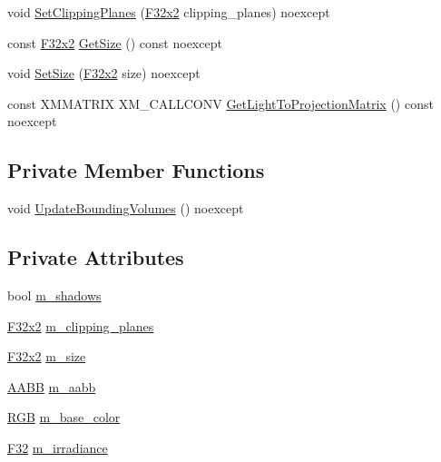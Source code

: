 \begin{DoxyCompactItemize}
\item 
void \mbox{\hyperlink{classmage_1_1rendering_1_1_directional_light_ae90562c217d876a3a2a73f36f36a700f}{Set\+Clipping\+Planes}} (\mbox{\hyperlink{namespacemage_aee4759dedc8def6c6dec26b5c7eddf29}{F32x2}} clipping\+\_\+planes) noexcept
\item 
const \mbox{\hyperlink{namespacemage_aee4759dedc8def6c6dec26b5c7eddf29}{F32x2}} \mbox{\hyperlink{classmage_1_1rendering_1_1_directional_light_ace3c9b19fcb107d45ecff698eb5c0d36}{Get\+Size}} () const noexcept
\item 
void \mbox{\hyperlink{classmage_1_1rendering_1_1_directional_light_aae69d3285b7980ad7215e1b517d0a8fd}{Set\+Size}} (\mbox{\hyperlink{namespacemage_aee4759dedc8def6c6dec26b5c7eddf29}{F32x2}} size) noexcept
\item 
const X\+M\+M\+A\+T\+R\+IX X\+M\+\_\+\+C\+A\+L\+L\+C\+O\+NV \mbox{\hyperlink{classmage_1_1rendering_1_1_directional_light_a865c8996fa02caf911718ac839435370}{Get\+Light\+To\+Projection\+Matrix}} () const noexcept
\end{DoxyCompactItemize}
\subsection*{Private Member Functions}
\begin{DoxyCompactItemize}
\item 
void \mbox{\hyperlink{classmage_1_1rendering_1_1_directional_light_ae87cdab887cc3f7e01b32485ff5aed5f}{Update\+Bounding\+Volumes}} () noexcept
\end{DoxyCompactItemize}
\subsection*{Private Attributes}
\begin{DoxyCompactItemize}
\item 
bool \mbox{\hyperlink{classmage_1_1rendering_1_1_directional_light_a64fa40ef9f9d0ae8a0856aabd44f0cae}{m\+\_\+shadows}}
\item 
\mbox{\hyperlink{namespacemage_aee4759dedc8def6c6dec26b5c7eddf29}{F32x2}} \mbox{\hyperlink{classmage_1_1rendering_1_1_directional_light_a296e8b5c22f96f0701744e0bedc4a17a}{m\+\_\+clipping\+\_\+planes}}
\item 
\mbox{\hyperlink{namespacemage_aee4759dedc8def6c6dec26b5c7eddf29}{F32x2}} \mbox{\hyperlink{classmage_1_1rendering_1_1_directional_light_ad983ca7abf8cf1f542fd68b4dfbf2ba2}{m\+\_\+size}}
\item 
\mbox{\hyperlink{classmage_1_1_a_a_b_b}{A\+A\+BB}} \mbox{\hyperlink{classmage_1_1rendering_1_1_directional_light_a33bf67ba5b273b3f7c7bce943696561d}{m\+\_\+aabb}}
\item 
\mbox{\hyperlink{structmage_1_1_r_g_b}{R\+GB}} \mbox{\hyperlink{classmage_1_1rendering_1_1_directional_light_a55d415fffd8f59f296e4d380639d3af1}{m\+\_\+base\+\_\+color}}
\item 
\mbox{\hyperlink{namespacemage_aa97e833b45f06d60a0a9c4fc22ae02c0}{F32}} \mbox{\hyperlink{classmage_1_1rendering_1_1_directional_light_a72b58bf80a9f40934622aee9f68aa545}{m\+\_\+irradiance}}
\end{DoxyCompactItemize}
